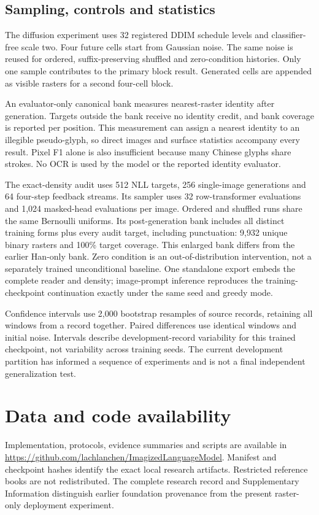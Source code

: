 \subsection*{Sampling, controls and statistics}
The diffusion experiment uses 32 registered DDIM schedule levels and classifier-free scale
two. Four future cells start from Gaussian noise. The same noise is reused for
ordered, suffix-preserving shuffled and zero-condition histories. Only one
sample contributes to the primary block result. Generated cells are appended
as visible rasters for a second four-cell block.

An evaluator-only canonical bank measures nearest-raster identity after
generation. Targets outside the bank receive no identity credit, and bank
coverage is reported per position. This measurement can assign a nearest
identity to an illegible pseudo-glyph, so direct images and surface statistics
accompany every result. Pixel F1 alone is also insufficient because many
Chinese glyphs share strokes. No OCR is used by the model or the reported
identity evaluator.

The exact-density audit uses 512 NLL targets, 256 single-image generations and
64 four-step feedback streams. Its sampler uses 32 row-transformer evaluations
and 1,024 masked-head evaluations per image. Ordered and shuffled runs share
the same Bernoulli uniforms. Its post-generation bank includes all distinct
training forms plus every audit target, including punctuation: 9,932 unique
binary rasters and 100\% target coverage. This enlarged bank differs from the
earlier Han-only bank. Zero condition is an out-of-distribution intervention,
not a separately trained unconditional baseline. One standalone export embeds
the complete reader and density; image-prompt inference reproduces the
training-checkpoint continuation exactly under the same seed and greedy mode.

Confidence intervals use 2,000 bootstrap resamples of source records, retaining
all windows from a record together. Paired differences use identical windows
and initial noise. Intervals describe development-record variability for this
trained checkpoint, not variability across training seeds. The current
development partition has informed a sequence of experiments and is not a
final independent generalization test.

\balance
\section*{Data and code availability}
Implementation, protocols, evidence summaries and scripts are available in
\url{https://github.com/lachlanchen/ImagizedLanguageModel}. Manifest and
checkpoint hashes identify the exact local research artifacts. Restricted
reference books are not redistributed. The complete research record and
Supplementary Information distinguish earlier foundation provenance from the
present raster-only deployment experiment.



